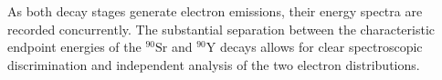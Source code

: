 As both decay stages generate electron emissions, their energy spectra are recorded concurrently. The substantial separation between the characteristic endpoint energies of the $^{90}\mathrm{Sr}$ and $^{90}\mathrm{Y}$ decays allows for clear spectroscopic discrimination and independent analysis of the two electron distributions.
